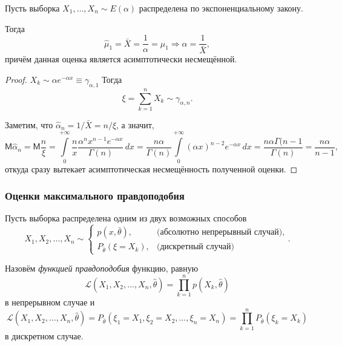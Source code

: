 \begin{ex}
  Пусть выборка $X_1, \dots, X_n \sim E(\alpha)$ распределена по
	экспоненциальному закону.

  Тогда
	\[
		\hat \mu_1 = \bar{X} = \frac{1}{\alpha} = \mu_1 \Rightarrow \alpha =
		\frac{1}{\bar{X}},
	\]
	причём данная оценка является асимптотически несмещённой. %
  \begin{proof}
    $X_k \sim \alpha e^{-\alpha x} \equiv \gamma_{\alpha, 1}$
		Тогда
		\[
			\xi = \sum_{k=1}^n X_k \sim \gamma_{\alpha, n}.
		\]

		Заметим, что $ \hat \alpha_n = 1/\bar X = n/\xi $, а значит,
		\[
			\mathsf M \hat \alpha_n = \mathsf M \frac{n}{\xi} = \int\limits_0^{+\infty} \frac{n}{x}
			\frac{\alpha^n x^{n-1} e^{-\alpha x}}{\Gamma(n)} \, dx = \frac{n
			\alpha}{\Gamma(n)} \int\limits_0^{+\infty} (\alpha x)^{n-2} e^{-\alpha x}
			\, dx = \frac{n\alpha \Gamma(n-1}{\Gamma(n)} = \frac{n\alpha}{n-1},
		\]
		откуда сразу вытекает асимптотическая несмещённость полученной оценки.

  \end{proof}
\end{ex}


\subsubsection{Оценки максимального правдоподобия}
Пусть выборка распределена одним из двух возможных способов
\[
	X_1, X_2, \dots, X_n \sim
  \begin{cases}
    p(x, \bar\theta), &\text{(абсолютно непрерывный случай)}, \\
    P_{\bar \theta}(\xi = X_k), &\text{(дискретный случай)} \end{cases}.
\]
\begin{definition}
	Назовём \emph{функцией правдоподобия} функцию, равную
	\[
		\mathscr{L} (X_1, X_2, \dots, X_n, \hat\theta) = 
		\prod_{k=1}^n p(X_k, \hat \theta)
	\]
в непрерывном случае и  
\[
	\mathscr{L} (X_1, X_2, \dots, X_n, \hat\theta) = P_{\bar\theta}(\xi_1 =
		X_1, \xi_2 = X_2, \dots, \xi_n = X_n) = \prod_{k=1}^n P_{\bar\theta}(\xi_k = X_k)
\]
в дискретном случае.
\end{definition}

